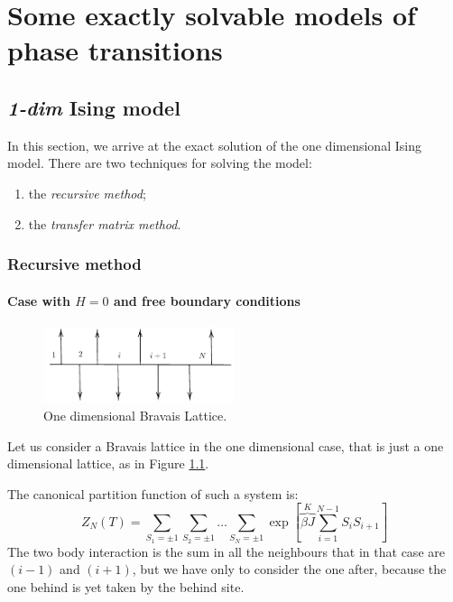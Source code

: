 \documentclass[../../Main/Main.tex]{subfiles}
\begin{document}
\chapter{Some exactly solvable models of phase transitions}

\section{\emph{1-dim} Ising model}
In this section, we arrive at the exact solution of the one dimensional Ising model.
 There are two techniques for solving the model:
\begin{enumerate}
\item the \emph{recursive method};
\item the \emph{transfer matrix method}.
\end{enumerate}

\subsection{Recursive method}

\subsubsection{Case with \( H=0 \) and free boundary conditions}

\begin{figure}[H]
\centering
\includegraphics[width=0.5\textwidth]{./img/2__1.pdf}
\caption{\label{fig:6_2} One dimensional Bravais Lattice.}
\end{figure}

Let us consider a Bravais lattice in the one dimensional case, that is just a one dimensional lattice, as in Figure \ref{fig:6_2}.

The canonical partition function of such a system is:
\begin{equation}
  Z_N (T) = \sum_{S_1 = \pm 1}^{} \sum_{S_2 = \pm 1}^{} \dots  \sum_{S_N = \pm 1}^{} \exp [
  \overbrace{ \beta J}^{K}  \sum_{i=1}^{N-1} S_i S_{i+1}  ]
\end{equation}
The two body interaction is the sum in all the neighbours that in that case are \( (i-1) \)  and \( (i+1) \), but we have only to consider the one after, because the one behind is yet taken by the behind site.
\end{document}
